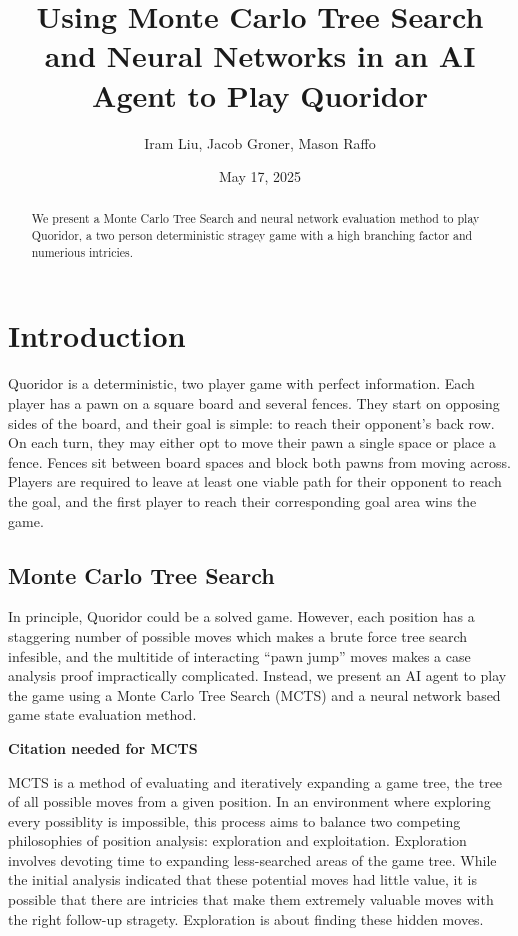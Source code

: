 \documentclass[10pt]{article}
\title{\bfseries Using Monte Carlo Tree Search and Neural Networks in an AI Agent to Play Quoridor}
\author{
    Iram Liu, Jacob Groner, Mason Raffo
}
\date{May 17, 2025}
\begin{document}
\maketitle

\begin{abstract}
We present a Monte Carlo Tree Search and neural network evaluation method to play Quoridor, a two person deterministic stragey game with a high branching factor and numerious intricies.
\end{abstract}

\section{Introduction}
Quoridor is a deterministic, two player game with perfect information. Each player has a pawn on a square board and several fences. They start on opposing sides of the board, and their goal is simple: to reach their opponent's back row. On each turn, they may either opt to move their pawn a single space or place a fence. Fences sit between board spaces and block both pawns from moving across. Players are required to leave at least one viable path for their opponent to reach the goal, and the first player to reach their corresponding goal area wins the game.

\subsection{Monte Carlo Tree Search}

In principle, Quoridor could be a solved game. However, each position has a staggering number of possible moves which makes a brute force tree search infesible, and the multitide of interacting ``pawn jump'' moves makes a case analysis proof impractically complicated. Instead, we present an AI agent to play the game using a Monte Carlo Tree Search (MCTS) and a neural network based game state evaluation method.

\textbf{Citation needed for MCTS}

MCTS is a method of evaluating and iteratively expanding a game tree, the tree of all possible moves from a given position. In an environment where exploring every possiblity is impossible, this process aims to balance two competing philosophies of position analysis: exploration and exploitation. Exploration involves devoting time to expanding less-searched areas of the game tree. While the initial analysis indicated that these potential moves had little value, it is possible that there are intricies that make them extremely valuable moves with the right follow-up stragety. Exploration is about finding these hidden moves.
\end{document}
